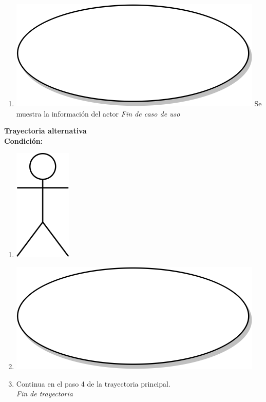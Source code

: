 \begin{enumerate}
\item {\includegraphics[scale=.05]{Capitulo3/img/proceso.png} Se muestra la información del actor}
  \textit{Fin de caso de uso} \\  
\end{enumerate}

\textbf{Trayectoria alternativa} \label{cu3_3_ta_} \\
\textbf{Condición:} \\
 \begin{enumerate}[label=\arabic*]
    \item {\includegraphics[scale=.1]{Capitulo3/img/actor.png} }
    \item {\includegraphics[scale=.05]{Capitulo3/img/proceso.png}}
    \item {Continua en el paso 4 de la trayectoria principal.} \\
    \textit{Fin de trayectoria} \\
\end{enumerate}

